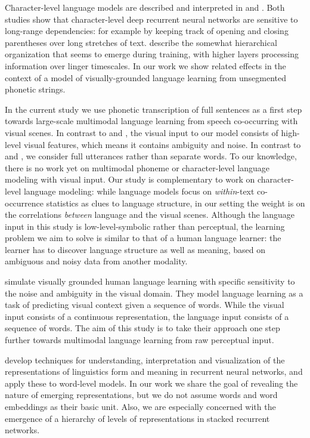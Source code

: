 Character-level language models are described and interpreted in  and . Both studies show that character-level deep recurrent neural networks are sensitive to long-range dependencies: for example by keeping track of opening and closing parentheses over long stretches of text.  describe the somewhat hierarchical organization that seems to emerge during training, with higher layers processing information over linger timescales. In our work we show related effects in the context of a model of visually-grounded language learning from unsegmented phonetic strings.

In the current study we use phonetic transcription of full sentences as a first step towards large-scale multimodal language learning from speech co-occurring with visual scenes. In contrast to  and , the visual input to our model consists of high-level visual features, which means it contains ambiguity and noise. In contrast to  and  , we consider full utterances rather than separate words. To our knowledge, there is no work yet on multimodal phoneme or character-level language modeling with visual input. Our study is complementary to work on character-level language modeling: while language models focus on {\it within}-text co-occurrence statistics as clues to language structure, in our setting the weight is on the correlations  {\it between} language and the visual scenes. Although the language input in this study is low-level-symbolic rather than perceptual, the learning problem we aim to solve is similar to that of a human language learner: the learner has to discover language structure as well as meaning, based on ambiguous and noisy data from another modality.  

 simulate visually grounded human language learning with specific sensitivity to the noise and ambiguity in the visual domain. They model language learning as a task of predicting visual context given a sequence of words. While the visual input consists of a continuous representation, the language input consists of a sequence of words. The aim of this study is to take their approach one step further towards multimodal language learning from raw perceptual input. 

 develop techniques for understanding, interpretation and visualization of the representations of linguistics form and meaning in recurrent neural networks, and apply these to word-level models. In our work we share the goal of revealing the nature of emerging representations, but we do not assume words and word embeddings as their basic unit. Also, we are especially concerned with the emergence of a hierarchy of levels of representations in stacked recurrent networks.

 